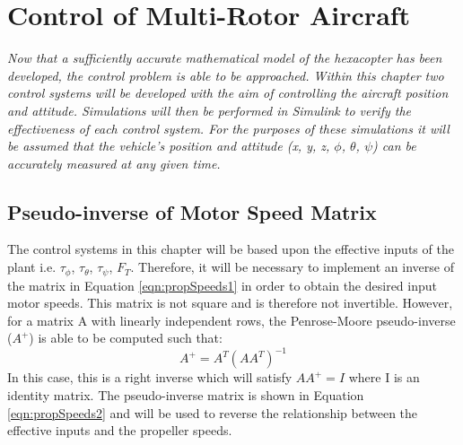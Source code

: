 
\chapter{Control of Multi-Rotor Aircraft}

\textit{Now that a sufficiently accurate mathematical model of the hexacopter has been developed, the control problem is able to be approached. Within this chapter two control systems will be developed with the aim of controlling the aircraft position and attitude. Simulations will then be performed in Simulink to verify the effectiveness of each control system. For the purposes of these simulations it will be assumed that the vehicle's position and attitude (x, y, z, $\phi$, $\theta$, $\psi$) can be accurately measured at any given time.} 

\section{Pseudo-inverse of Motor Speed Matrix}
The control systems in this chapter will be based upon the effective inputs of the plant i.e. $\tau_{\phi}$, $\tau_{\theta}$, $\tau_{\psi}$, $F_{T}$. Therefore, it will be necessary to implement an inverse of the matrix in Equation \ref{eqn:propSpeeds1} in order to obtain the desired input motor speeds. This matrix is not square and is therefore not invertible. However, for a matrix A with linearly independent rows, the Penrose-Moore pseudo-inverse ($A^{+}$) is able to be computed such  that: 
\[A^{+}= A^{T}(AA^{T})^{-1}\]
In this case, this is a right inverse which will satisfy \(AA^{+}=I\) where I is an identity matrix. The pseudo-inverse matrix is shown in Equation \ref{eqn:propSpeeds2} and will be used to reverse the relationship between the effective inputs and the propeller speeds.
